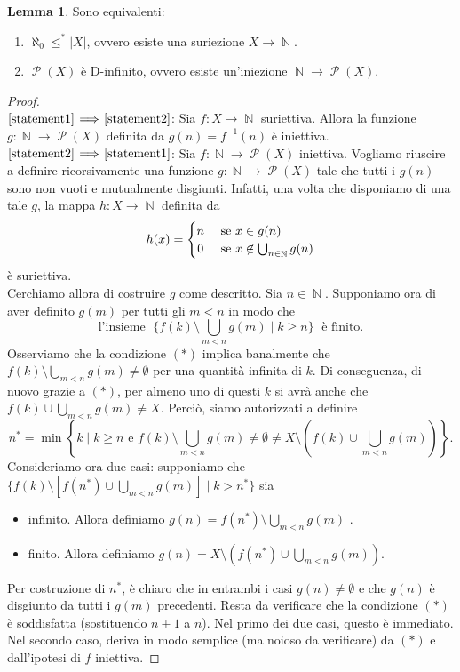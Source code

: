 \documentclass[12pt,a4paper]{report}
\theoremstyle{definition}
\newtheorem{lemma}[teo]{Lemma}  %
\theoremstyle{num.custom-title}
\DeclareMathOperator{\PP}{\mathcal{P}}
\DeclareMathOperator{\N}{\mathbb{N}}
\DeclareMathOperator{\sm}{\setminus}
\newcommand{\Implies}[2]{$\text{\ref{statement#1}}\!\implies\!\text{\ref{statement#2}}$}%
\newcommand{\punto}[1]{\item \label{statement#1}}
\newenvironment{equivalence}
    {\begin{enumerate}[label=(\arabic*),ref=(\arabic*)]
    }
    { 
	\end{enumerate}
    }
\begin{document}
\begin{lemma}\label{lemma_suriez_d-fin} Sono equivalenti:
\begin{equivalence}
\punto{1} $\aleph_0 \leq^* |X|$, ovvero esiste una suriezione $X \to \N$.
\punto{2} $\PP(X)$ è D-infinito, ovvero esiste un'iniezione $\N \to \PP(X)$.
\end{equivalence}
\begin{proof}\ \\
\Implies{1}{2}: Sia $f: X \to \N$ suriettiva. Allora la funzione $g: \N \to \PP(X)$ definita da $g(n)=f^{-1}(n)$ è iniettiva.\\
\Implies{2}{1}: Sia $f: \N \to \PP(X)$ iniettiva. Vogliamo riuscire a definire ricorsivamente una funzione $g: \N \to \PP(X)$ tale che tutti i $g(n)$ sono non vuoti e mutualmente disgiunti. Infatti, una volta che disponiamo di una tale $g$, la mappa $h: X \to \N$ definita da
\[
h(x)=
  \begin{cases} 
      \hfill		n	\hfill & \text{ se $x \in g(n)$} \\
      \hfill 	0		\hfill & \text{ se $x \not\in \bigcup_{n \in \N} g(n)$} \\
  \end{cases}
\]
è suriettiva.\\
Cerchiamo allora di costruire $g$ come descritto. Sia $n \in \N$. Supponiamo ora di aver definito $g(m)$ per tutti gli $m<n$ in modo che
\begin{equation*}\tag{$*$}
\text{l'insieme } \;\{f(k) \sm \bigcup_{m<n} g(m) \mid k \geq n\}\; \text{ è finito.}
\end{equation*}
Osserviamo che la condizione $(*)$ implica banalmente che $f(k) \sm \bigcup_{m<n} g(m) \neq \emptyset$ per una quantità infinita di $k$. Di conseguenza, di nuovo grazie a $(*)$, per almeno uno di questi $k$ si avrà anche che $f(k) \cup \bigcup_{m<n} g(m) \neq X$. Perciò, siamo autorizzati a definire
\[
n^* = \min \left\{ k \; \Bigg\rvert \; k \geq n \text{ e } 
f(k) \sm \bigcup_{m<n} g(m) \neq \emptyset \neq X \sm \left( f(k) \cup \bigcup_{m<n} g(m) \right) \right\}.
\]
Consideriamo ora due casi: supponiamo che 
$\{f(k) \sm [f(n^*) \cup \bigcup_{m<n} g(m)] \mid k>n^*\}$ sia
\begin{itemize}
\item infinito. Allora definiamo $g(n) = f(n^*) \sm \bigcup_{m<n} g(m)$ .
\item finito. Allora definiamo $g(n) = X \sm \left( f(n^*) \cup \bigcup_{m<n} g(m) \right)$.
\end{itemize}
Per costruzione di $n^*$, è chiaro che in entrambi i casi $g(n) \neq \emptyset$ e che $g(n)$ è disgiunto da tutti i $g(m)$ precedenti. Resta da verificare che la condizione $(*)$ è soddisfatta (sostituendo $n+1$ a $n$). Nel primo dei due casi, questo è immediato. Nel secondo caso, deriva in modo semplice (ma noioso da verificare) da $(*)$ e dall'ipotesi di $f$ iniettiva.
\end{proof}
\end{lemma}
\end{document}
